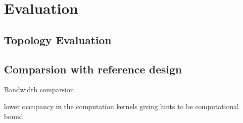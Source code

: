 \chapter{Evaluation}
\label{cha:Evaluation}

\section{Topology Evaluation}

\section{Comparsion with reference design}

Bandwidth comparsion


lower occupancy in the computation kernels giving hints to be computational
bound



